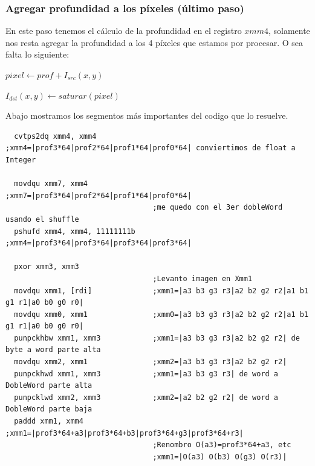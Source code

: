 \subsubsection*{Agregar profundidad a los píxeles (último paso)}

En este paso tenemos el cálculo de la profundidad en el registro $xmm4$, solamente nos resta agregar la profundidad a los 4 píxeles que estamos por procesar. O sea falta lo siguiente:

\begin{center}
       $pixel \gets prof + I_{src}(x, y)$    
      
      $I_{dst}(x, y) \gets saturar(pixel)$
\end{center}

Abajo mostramos los segmentos más importantes del codigo que lo resuelve.

\begin{codesnippet}
\begin{verbatim}
  cvtps2dq xmm4, xmm4             ;xmm4=|prof3*64|prof2*64|prof1*64|prof0*64| conviertimos de float a Integer

  movdqu xmm7, xmm4               ;xmm7=|prof3*64|prof2*64|prof1*64|prof0*64|
                                  ;me quedo con el 3er dobleWord usando el shuffle
  pshufd xmm4, xmm4, 11111111b    ;xmm4=|prof3*64|prof3*64|prof3*64|prof3*64|

  pxor xmm3, xmm3
                                  ;Levanto imagen en Xmm1
  movdqu xmm1, [rdi]              ;xmm1=|a3 b3 g3 r3|a2 b2 g2 r2|a1 b1 g1 r1|a0 b0 g0 r0|			
  movdqu xmm0, xmm1               ;xmm0=|a3 b3 g3 r3|a2 b2 g2 r2|a1 b1 g1 r1|a0 b0 g0 r0|
  punpckhbw xmm1, xmm3            ;xmm1=|a3 b3 g3 r3|a2 b2 g2 r2| de byte a word parte alta
  movdqu xmm2, xmm1               ;xmm2=|a3 b3 g3 r3|a2 b2 g2 r2| 
  punpckhwd xmm1, xmm3            ;xmm1=|a3 b3 g3 r3| de word a DobleWord parte alta
  punpcklwd xmm2, xmm3            ;xmm2=|a2 b2 g2 r2| de word a DobleWord parte baja
  paddd xmm1, xmm4                ;xmm1=|prof3*64+a3|prof3*64+b3|prof3*64+g3|prof3*64+r3|
                                  ;Renombro O(a3)=prof3*64+a3, etc
                                  ;xmm1=|O(a3) O(b3) O(g3) O(r3)|
\end{verbatim}
\end{codesnippet}

